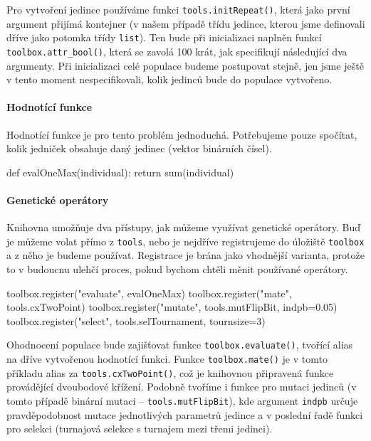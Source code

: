 Pro vytvoření jedince používáme funkci \texttt{tools.initRepeat()}, která jako
první argument přijímá kontejner (v našem případě třídu jedince, kterou jsme
definovali dříve jako potomka třídy \texttt{list}). Ten bude při inicializaci
naplněn funkcí \texttt{toolbox.attr\_bool()}, která se zavolá 100 krát, jak
specifikují následující dva argumenty. Při inicializaci celé populace budeme
postupovat stejně, jen jsme ještě v tento moment nespecifikovali, kolik jedinců
bude do populace vytvořeno.

\paragraph{Hodnotící funkce}
Hodnotící funkce je pro tento problém jednoduchá. Potřebujeme pouze spočítat,
kolik jedniček obsahuje daný jedinec (vektor binárních čísel).

\begin{code}
def evalOneMax(individual):
    return sum(individual)
\end{code}

\paragraph{Genetické operátory}
Knihovna umožňuje dva přístupy, jak můžeme využívat genetické operátory. Buď je
můžeme volat přímo z \texttt{tools}, nebo je nejdříve registrujeme do úložiště
\texttt{toolbox} a z něho je budeme používat. Registrace je brána jako
vhodnější varianta, protože to v budoucnu ulehčí proces, pokud bychom chtěli
měnit používané operátory.

\begin{code}
toolbox.register("evaluate", evalOneMax)
toolbox.register("mate", tools.cxTwoPoint)
toolbox.register("mutate", tools.mutFlipBit, indpb=0.05)
toolbox.register("select", tools.selTournament, tournsize=3)
\end{code}

Ohodnocení populace bude zajišťovat funkce \texttt{toolbox.evaluate()}, tvořící
alias na dříve vytvořenou hodnotící funkci. Funkce \texttt{toolbox.mate()} je v
tomto příkladu alias za \texttt{tools.cxTwoPoint()}, což je knihovnou
připravená funkce provádějící dvoubodové křížení. Podobně tvoříme i funkce pro
mutaci jedinců (v tomto případě binární mutaci -- \texttt{tools.mutFlipBit}),
kde argument \texttt{indpb} určuje pravděpodobnost mutace jednotlivých
parametrů jedince a v poslední řadě funkci pro selekci (turnajová selekce s
turnajem mezi třemi jedinci).
        
